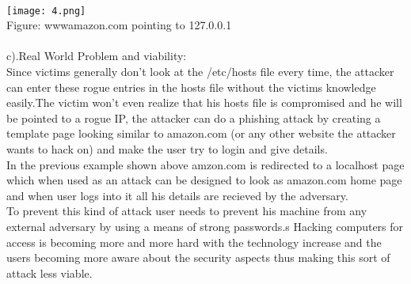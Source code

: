 \documentclass{article}
\begin{document}
\\
\texttt{[image: 4.png]}
\\Figure: wwwamazon.com pointing to 127.0.0.1
\\ 
\\
c).Real World Problem and viability:
\\
Since victims generally don’t look at the /etc/hosts file every time, the attacker can enter these rogue entries in the hosts file without the victims knowledge easily.The victim won’t even realize that his hosts file is compromised and he will be pointed to a rogue IP, the attacker can do a phishing attack by creating a template page looking similar to amazon.com (or any other website the attacker wants to hack on) and make the user try to login and give details.
\\
In the previous example shown above amzon.com is redirected to a localhost page which when used as an attack can be designed to look as amazon.com home page and when user logs into it all his details are recieved by the adversary.
\\
To prevent this kind of attack user needs to prevent his machine from any external adversary by using a means of strong passwords.s
Hacking computers for access is becoming more and more hard with the technology increase and the users becoming more aware about the security aspects thus making this sort of attack less viable.
\\
\\
\end{document}
